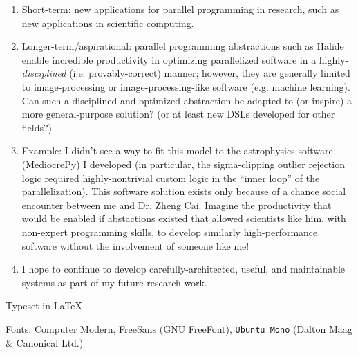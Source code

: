 \documentclass[11pt]{article}
\begin{document}
\begin{enumerate}
\item Short-term: new applications for parallel programming in
  research, such as new applications in scientific computing.
\item Longer-term/aspirational: parallel programming abstractions such
  as Halide enable incredible productivity in optimizing parallelized
  software in a highly-\textit{disciplined} (i.e. provably-correct)
  manner; however, they are generally limited to image-processing or
  image-processing-like software (e.g. machine learning). Can such a
  disciplined and optimized abstraction be adapted to (or inspire) a
  more general-purpose solution? (or at least new DSLs developed for
  other fields?)
\item Example: I didn't see a way to fit this model to the
  astrophysics software (MediocrePy) I developed (in particular, the
  sigma-clipping outlier rejection logic required highly-nontrivial
  custom logic in the ``inner loop'' of the parallelization). This
  software solution exists only because of a chance social encounter
  between me and Dr. Zheng Cai. Imagine the productivity that would be
  enabled if abstactions existed that allowed scientists like him,
  with non-expert programming skills, to develop similarly
  high-performance software without the involvement of someone like
  me!
\item I hope to continue to develop carefully-architected, useful, and
  maintainable systems as part of my future research work.
\end{enumerate}

{
\vfill
\begin{center}
\color{gray}
Typeset in \LaTeX\

Fonts: Computer Modern, \textsf{FreeSans} (GNU FreeFont),
\texttt{Ubuntu Mono} (Dalton Maag \& Canonical Ltd.)
\end{center}
}
\end{document}
